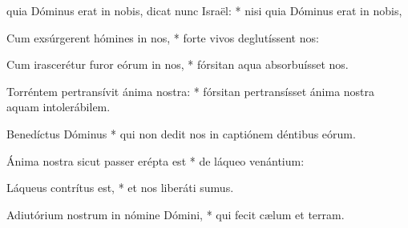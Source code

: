 \begin{psalmus}

 quia Dóminus erat in nobis, dicat nunc Israël: * nisi quia Dóminus erat in nobis,

Cum exsúrgerent hómines in nos, * forte vivos deglutíssent nos:

Cum irascerétur furor eórum in nos, * fórsitan aqua absorbuísset nos.

Torréntem pertransívit ánima nostra: * fórsitan pertransísset ánima nostra aquam intolerábilem.

Benedíctus Dóminus * qui non dedit nos in captiónem déntibus eórum.

Ánima nostra sicut passer erépta est * de láqueo venántium:

Láqueus contrítus est, * et nos liberáti sumus.

Adiutórium nostrum in nómine Dómini, * qui fecit cælum et terram.

\end{psalmus}
